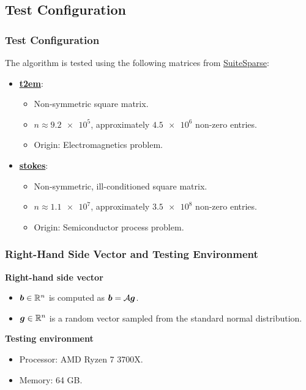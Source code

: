 \subsection{Test Configuration}

\begin{frame}
    \frametitle{Test Configuration}

    The algorithm is tested using the following matrices from \href{https://sparse.tamu.edu}{SuiteSparse}:

    \begin{itemize}
        \item \textbf{\href{https://sparse.tamu.edu/CEMW/t2em}{t2em}}: 
        \begin{itemize}
            \item Non-symmetric square matrix.
            \item $n \approx \num{9.2e5}$, approximately $\num{4.5e6}$ non-zero entries.
            \item Origin: Electromagnetics problem.
        \end{itemize}
        \item \textbf{\href{https://sparse.tamu.edu/VLSI/stokes}{stokes}}: 
        \begin{itemize}
            \item Non-symmetric, ill-conditioned square matrix.
            \item $n \approx \num{1.1e7}$, approximately $\num{3.5e8}$ non-zero entries.
            \item Origin: Semiconductor process problem.
        \end{itemize}
    \end{itemize}

\end{frame}

\begin{frame}
    \frametitle{Right-Hand Side Vector and Testing Environment}

    \textbf{Right-hand side vector}
    \begin{itemize}
        \item $\bm{b} \in \mathbb{R}^{n}$ is computed as $\bm{b} = \mathcal{A} \bm{g}$.
        \item $\bm{g} \in \mathbb{R}^{n}$ is a random vector sampled from the standard normal distribution.
    \end{itemize}

    \textbf{Testing environment}
    \begin{itemize}
        \item Processor: AMD Ryzen 7 3700X.
        \item Memory: 64 GB.
    \end{itemize}

\end{frame}

